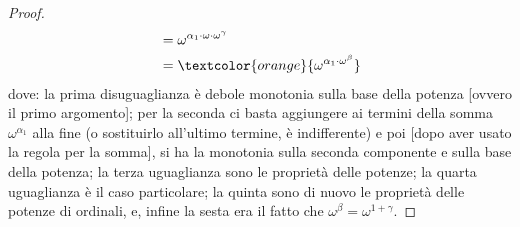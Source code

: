 \documentclass[11pt]{scrartcl}
\begin{document}
\begin{proof}
\[\begin{split}
															   &= \omega^{\alpha_1 \cdot \omega \cdot \omega^\gamma} \\
															   &= \textcolor{orange}{\omega^{\alpha_1 \cdot \omega^\beta}}
	\end{split}
		\]
	dove: la prima disuguaglianza è debole monotonia sulla base della potenza [ovvero il primo argomento]; per la seconda ci basta aggiungere ai termini della somma $\omega^{\alpha_1}$ alla fine (o sostituirlo all'ultimo termine, è indifferente) e poi [dopo aver usato la regola per la somma],
	si ha la monotonia sulla seconda componente e sulla base della potenza; la terza uguaglianza sono le proprietà delle potenze; la quarta uguaglianza è il caso particolare; la quinta sono di nuovo le proprietà delle potenze di ordinali, e, infine la sesta era il fatto che $\omega^\beta = \omega^{1 + \gamma}$.
\end{proof}
\end{document}

